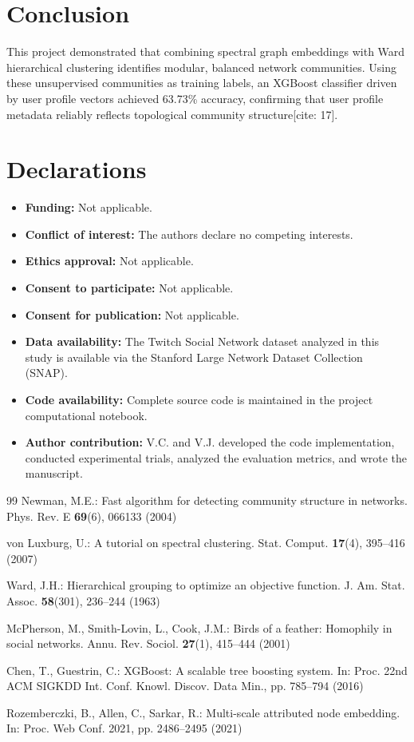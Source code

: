 \documentclass[sn-mathphys,Numbered]{sn-jnl}
\begin{document}
\section{Conclusion}\label{sec5}
This project demonstrated that combining spectral graph embeddings with Ward hierarchical clustering identifies modular, balanced network communities. Using these unsupervised communities as training labels, an XGBoost classifier driven by user profile vectors achieved 63.73\% accuracy, confirming that user profile metadata reliably reflects topological community structure[cite: 17].

\section*{Declarations}
\begin{itemize}
\item \textbf{Funding:} Not applicable.
\item \textbf{Conflict of interest:} The authors declare no competing interests.
\item \textbf{Ethics approval:} Not applicable.
\item \textbf{Consent to participate:} Not applicable.
\item \textbf{Consent for publication:} Not applicable.
\item \textbf{Data availability:} The Twitch Social Network dataset analyzed in this study is available via the Stanford Large Network Dataset Collection (SNAP).
\item \textbf{Code availability:} Complete source code is maintained in the project computational notebook.
\item \textbf{Author contribution:} V.C. and V.J. developed the code implementation, conducted experimental trials, analyzed the evaluation metrics, and wrote the manuscript.
\end{itemize}

\begin{thebibliography}{99}
Newman, M.E.: Fast algorithm for detecting community structure in networks. Phys. Rev. E \textbf{69}(6), 066133 (2004)

von Luxburg, U.: A tutorial on spectral clustering. Stat. Comput. \textbf{17}(4), 395--416 (2007)

Ward, J.H.: Hierarchical grouping to optimize an objective function. J. Am. Stat. Assoc. \textbf{58}(301), 236--244 (1963)

McPherson, M., Smith-Lovin, L., Cook, J.M.: Birds of a feather: Homophily in social networks. Annu. Rev. Sociol. \textbf{27}(1), 415--444 (2001)

Chen, T., Guestrin, C.: XGBoost: A scalable tree boosting system. In: Proc. 22nd ACM SIGKDD Int. Conf. Knowl. Discov. Data Min., pp. 785--794 (2016)

Rozemberczki, B., Allen, C., Sarkar, R.: Multi-scale attributed node embedding. In: Proc. Web Conf. 2021, pp. 2486--2495 (2021)
\end{thebibliography}
\end{document}
